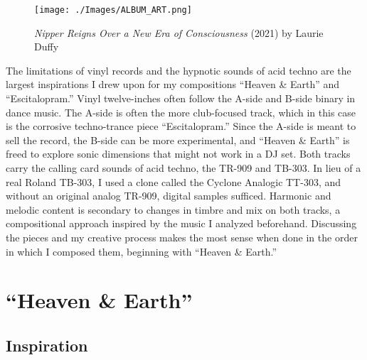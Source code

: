 \documentclass[12pt,twoside]{reedthesis}
\begin{document}
\begin{figure}
	\begin{centering}
		\texttt{[image: ./Images/ALBUM\_ART.png]}
		\caption{\emph{Nipper Reigns Over a New Era of Consciousness} (2021) by Laurie Duffy}
		\label{fig:albumart}
	\end{centering}
\end{figure}

The limitations of vinyl records and the hypnotic sounds of acid techno are the largest inspirations I drew upon for my compositions ``Heaven {\&} Earth'' and ``Escitalopram.'' Vinyl twelve-inches often follow the A-side and B-side binary in dance music. The A-side is often the more club-focused track, which in this case is the corrosive techno-trance piece ``Escitalopram.'' Since the A-side is meant to sell the record, the B-side can be more experimental, and ``Heaven {\&} Earth'' is freed to explore sonic dimensions that might not work in a DJ set. Both tracks carry the calling card sounds of acid techno, the TR-909 and TB-303. In lieu of a real Roland TB-303, I used a clone called the Cyclone Analogic TT-303, and without an original analog TR-909, digital samples sufficed. Harmonic and melodic content is secondary to changes in timbre and mix on both tracks, a compositional approach inspired by the music I analyzed beforehand. Discussing the pieces and my creative process makes the most sense when done in the order in which I composed them, beginning with ``Heaven {\&} Earth.''

\section{``Heaven {\&} Earth''}

\subsection{Inspiration}
\end{document}
